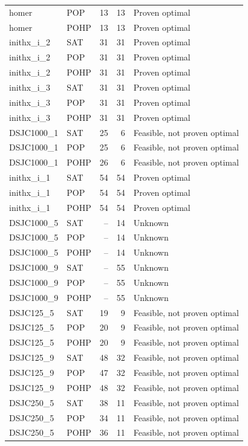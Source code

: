 \begin{longtable}{llrrl}
homer & POP & 13 & 13 & Proven optimal \\
homer & POHP & 13 & 13 & Proven optimal \\
inithx\_i\_2 & SAT & 31 & 31 & Proven optimal \\
inithx\_i\_2 & POP & 31 & 31 & Proven optimal \\
inithx\_i\_2 & POHP & 31 & 31 & Proven optimal \\
inithx\_i\_3 & SAT & 31 & 31 & Proven optimal \\
inithx\_i\_3 & POP & 31 & 31 & Proven optimal \\
inithx\_i\_3 & POHP & 31 & 31 & Proven optimal \\
DSJC1000\_1 & SAT & 25 & 6 & Feasible, not proven optimal \\
DSJC1000\_1 & POP & 25 & 6 & Feasible, not proven optimal \\
DSJC1000\_1 & POHP & 26 & 6 & Feasible, not proven optimal \\
inithx\_i\_1 & SAT & 54 & 54 & Proven optimal \\
inithx\_i\_1 & POP & 54 & 54 & Proven optimal \\
inithx\_i\_1 & POHP & 54 & 54 & Proven optimal \\
DSJC1000\_5 & SAT & -- & 14 & Unknown \\
DSJC1000\_5 & POP & -- & 14 & Unknown \\
DSJC1000\_5 & POHP & -- & 14 & Unknown \\
DSJC1000\_9 & SAT & -- & 55 & Unknown \\
DSJC1000\_9 & POP & -- & 55 & Unknown \\
DSJC1000\_9 & POHP & -- & 55 & Unknown \\
DSJC125\_5 & SAT & 19 & 9 & Feasible, not proven optimal \\
DSJC125\_5 & POP & 20 & 9 & Feasible, not proven optimal \\
DSJC125\_5 & POHP & 20 & 9 & Feasible, not proven optimal \\
DSJC125\_9 & SAT & 48 & 32 & Feasible, not proven optimal \\
DSJC125\_9 & POP & 47 & 32 & Feasible, not proven optimal \\
DSJC125\_9 & POHP & 48 & 32 & Feasible, not proven optimal \\
DSJC250\_5 & SAT & 38 & 11 & Feasible, not proven optimal \\
DSJC250\_5 & POP & 34 & 11 & Feasible, not proven optimal \\
DSJC250\_5 & POHP & 36 & 11 & Feasible, not proven optimal \\

\end{longtable}
